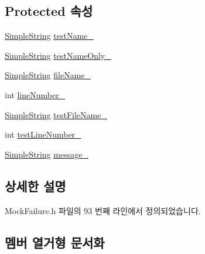 \subsection*{Protected 속성}
\begin{DoxyCompactItemize}
\item 
\hyperlink{class_simple_string}{Simple\+String} \hyperlink{class_test_failure_afb42d7601608c3597c5279ddaf87e9d6}{test\+Name\+\_\+}
\item 
\hyperlink{class_simple_string}{Simple\+String} \hyperlink{class_test_failure_a60a0b2466b44483497e83d73b70241f2}{test\+Name\+Only\+\_\+}
\item 
\hyperlink{class_simple_string}{Simple\+String} \hyperlink{class_test_failure_a58b6159b0aa3b9775be67920baef742c}{file\+Name\+\_\+}
\item 
int \hyperlink{class_test_failure_ab83f5a7389dae9b8045aa6fbf55b153a}{line\+Number\+\_\+}
\item 
\hyperlink{class_simple_string}{Simple\+String} \hyperlink{class_test_failure_a19c231b59846532ec9d7ac8725886d67}{test\+File\+Name\+\_\+}
\item 
int \hyperlink{class_test_failure_abb1f7af8e12fc84b16898aa5b410ba2a}{test\+Line\+Number\+\_\+}
\item 
\hyperlink{class_simple_string}{Simple\+String} \hyperlink{class_test_failure_af95aeab689fdb637c3e94b0c10db3e53}{message\+\_\+}
\end{DoxyCompactItemize}


\subsection{상세한 설명}


Mock\+Failure.\+h 파일의 93 번째 라인에서 정의되었습니다.



\subsection{멤버 열거형 문서화}
